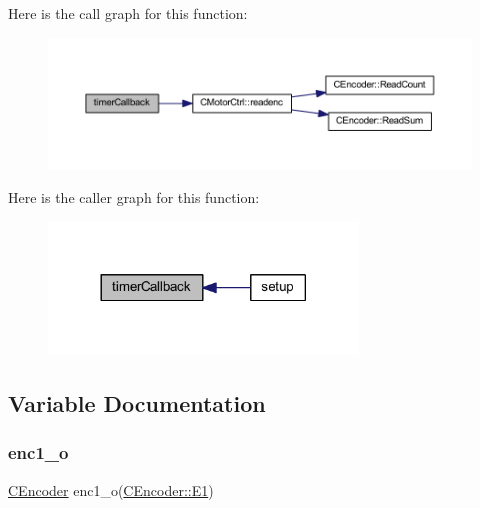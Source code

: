 Here is the call graph for this function\+:
\nopagebreak
\begin{figure}[H]
\begin{center}
\leavevmode
\includegraphics[width=350pt]{_a_d_a_s___m_c_u_8ino_a9f2f19081d81dba1b47615d1d9363281_cgraph}
\end{center}
\end{figure}
Here is the caller graph for this function\+:
\nopagebreak
\begin{figure}[H]
\begin{center}
\leavevmode
\includegraphics[width=233pt]{_a_d_a_s___m_c_u_8ino_a9f2f19081d81dba1b47615d1d9363281_icgraph}
\end{center}
\end{figure}


\subsection{Variable Documentation}
\mbox{\label{_a_d_a_s___m_c_u_8ino_ad90699f8fbb0fa8f734ae5c30885ee3b}} 
\subsubsection{\texorpdfstring{enc1\+\_\+o}{enc1\_o}}
{\footnotesize\ttfamily \mbox{\hyperlink{class_c_encoder}{C\+Encoder}} enc1\+\_\+o(\mbox{\hyperlink{class_c_encoder_a49810cc352199fb02a60e2ef8ac6cbc3a8f0ceb6874e0c79b53bf26fa42a1b652}{C\+Encoder\+::\+E1}})}

\mbox{\label{_a_d_a_s___m_c_u_8ino_a54cfc96aae4913b87ab356a0665557a5}} 
